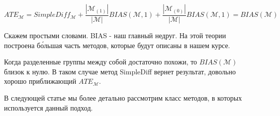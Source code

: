 \documentclass{article}
\begin{document}
        \[
            ATE_\mathcal{M} =
            SimpleDiff_\mathcal{M} +
            \frac{|\mathcal{M}_{(1)}|}{|\mathcal{M}|} BIAS(\mathcal{M}, 1) +
            \frac{|\mathcal{M}_{(0)}|}{|\mathcal{M}|} BIAS(\mathcal{M}, 1)
            =
            BIAS(\mathcal{M})
        \]

        Скажем простыми словами.
        BIAS - наш главный недруг.
        На этой теории построена б\'{о}льшая часть методов, которые будут описаны в нашем курсе.

        Когда разделенные группы между собой достаточно похожи, то $BIAS(\mathcal{M})$ близок к нулю.
        В таком случае метод SimpleDiff вернет результат, довольно хорошо приближающий $ATE_\mathcal{M}$.

        В следующей статье мы более детально рассмотрим класс методов, в которых используется данный подход.
\end{document}

